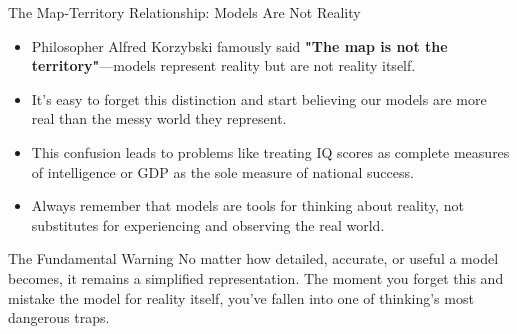 \documentclass{beamer}
\begin{document}
	\begin{frame}{The Map-Territory Relationship: Models Are Not Reality}
		\begin{itemize}
			\item Philosopher Alfred Korzybski famously said \textbf{"The map is not the territory"}—models represent reality but are not reality itself.
			\item It's easy to forget this distinction and start believing our models are more real than the messy world they represent.
			\item This confusion leads to problems like treating IQ scores as complete measures of intelligence or GDP as the sole measure of national success.
			\item Always remember that models are tools for thinking about reality, not substitutes for experiencing and observing the real world.
		\end{itemize}
		
		\begin{alertblock}{The Fundamental Warning}
			No matter how detailed, accurate, or useful a model becomes, it remains a simplified representation. The moment you forget this and mistake the model for reality itself, you've fallen into one of thinking's most dangerous traps.
		\end{alertblock}
	\end{frame}
	
\end{document}
